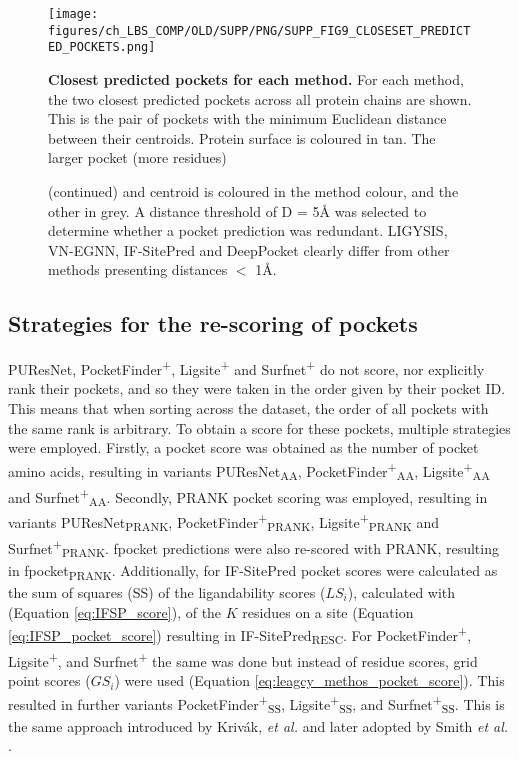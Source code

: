 \begin{figure}[ht!]
    \centering
    \texttt{[image: figures/ch\_LBS\_COMP/OLD/SUPP/PNG/SUPP\_FIG9\_CLOSESET\_PREDICTED\_POCKETS.png]}
    \caption[Closest predicted pockets for each methods]{\textbf{Closest predicted pockets for each method.} For each method, the two closest predicted pockets across all protein chains are shown. This is the pair of pockets with the minimum Euclidean distance between their centroids. Protein surface is coloured in tan. The larger pocket (more residues)}
    \label{fig:closest_pred_pockets}
\end{figure}

\begin{figure}[ht!]
\ContinuedFloat
\caption*{(continued)  and centroid is coloured in the method colour, and the other in grey. A distance threshold of D = 5\AA{} was selected to determine whether a pocket prediction was redundant. LIGYSIS, VN-EGNN, IF-SitePred and DeepPocket clearly differ from other methods presenting distances $<$ 1\AA{}.}
\end{figure}

\subsection{Strategies for the re-scoring of pockets}

PUResNet, PocketFinder\textsuperscript{+}, Ligsite\textsuperscript{+} and Surfnet\textsuperscript{+} do not score, nor explicitly rank their pockets, and so they were taken in the order given by their pocket ID. This means that when sorting across the dataset, the order of all pockets with the same rank is arbitrary. To obtain a score for these pockets, multiple strategies were employed. Firstly, a pocket score was obtained as the number of pocket amino acids, resulting in variants PUResNet\textsubscript{AA}, PocketFinder\textsuperscript{+}\textsubscript{AA}, Ligsite\textsuperscript{+}\textsubscript{AA} and Surfnet\textsuperscript{+}\textsubscript{AA}. Secondly, PRANK pocket scoring was employed, resulting in variants PUResNet\textsubscript{PRANK}, PocketFinder\textsuperscript{+}\textsubscript{PRANK}, Ligsite\textsuperscript{+}\textsubscript{PRANK} and Surfnet\textsuperscript{+}\textsubscript{PRANK}. fpocket predictions were also re-scored with PRANK, resulting in fpocket\textsubscript{PRANK}. Additionally, for IF-SitePred pocket scores were calculated as the sum of squares (SS) of the ligandability scores ($LS_{i}$), calculated with (Equation \ref{eq:IFSP_score}), of the $K$ residues on a site (Equation \ref{eq:IFSP_pocket_score}) resulting in IF-SitePred\textsubscript{RESC}. For PocketFinder\textsuperscript{+}, Ligsite\textsuperscript{+}, and Surfnet\textsuperscript{+} the same was done but instead of residue scores, grid point scores ($GS_{i}$) were used (Equation \ref{eq:leagcy_methos_pocket_score}). This resulted in further variants PocketFinder\textsuperscript{+}\textsubscript{SS}, Ligsite\textsuperscript{+}\textsubscript{SS}, and Surfnet\textsuperscript{+}\textsubscript{SS}. This is the same approach introduced by Krivák, \textit{et al.} \cite{KRIVAK_2015_P2RANK} and later adopted by Smith \textit{et al.} \cite{SMITH_2024_GrASP}.


